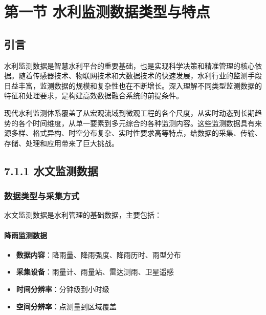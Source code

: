 \section{第一节
水利监测数据类型与特点}\label{ux7b2cux4e00ux8282-ux6c34ux5229ux76d1ux6d4bux6570ux636eux7c7bux578bux4e0eux7279ux70b9}

\subsection{引言}\label{ux5f15ux8a00}

水利监测数据是智慧水利平台的重要基础，也是实现科学决策和精准管理的核心依据。随着传感器技术、物联网技术和大数据技术的快速发展，水利行业的监测手段日益丰富，监测数据的规模和复杂性也在不断增长。深入理解不同类型监测数据的特征和处理要求，是构建高效数据融合系统的前提条件。

现代水利监测体系覆盖了从宏观流域到微观工程的各个尺度，从实时动态到长期趋势的各个时间维度，从单一要素到多元综合的各种监测内容。这些监测数据具有来源多样、格式异构、时空分布复杂、实时性要求高等特点，给数据的采集、传输、存储、处理和应用带来了巨大挑战。

\subsection{7.1.1
水文监测数据}\label{ux6c34ux6587ux76d1ux6d4bux6570ux636e}

\subsubsection{数据类型与采集方式}\label{ux6570ux636eux7c7bux578bux4e0eux91c7ux96c6ux65b9ux5f0f}

水文监测数据是水利管理的基础数据，主要包括：

\paragraph{降雨监测数据}\label{ux964dux96e8ux76d1ux6d4bux6570ux636e}

\begin{itemize}
\tightlist
\item
  \textbf{数据内容}：降雨量、降雨强度、降雨历时、雨型分布
\item
  \textbf{采集设备}：雨量计、雨量站、雷达测雨、卫星遥感
\item
  \textbf{时间分辨率}：分钟级到小时级
\item
  \textbf{空间分辨率}：点测量到区域覆盖
\end{itemize}

